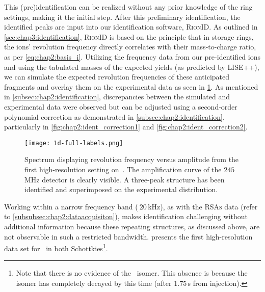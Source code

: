 \newpar
This (pre)identification can be realized without any prior knowledge of the ring settings, making it the initial step.
After this preliminary identification, the identified peaks are input into our identification software, \textsc{RionID}. As outlined in \cref{sec:chap3:identification}, \textsc{RionID} is based on the principle that in storage rings, the ions' revolution frequency directly correlates with their mass-to-charge ratio, as per \cref{eq:chap2:basis_i}.
Utilizing the frequency data from our pre-identified ions and using the tabulated masses \cite{AME-2020} of the expected yields (as predicted by \textsc{LISE++}), we can simulate the expected revolution frequencies of these anticipated fragments and overlay them on the experimental data as seen in \cref{fig:chap3:ident1D}.
As mentioned in \cref{subsec:chap2:identification}, discrepancies between the simulated and experimental data were observed but can be adjusted using a second-order polynomial correction as demonstrated in \cref{subsec:chap2:identification}, particularly in \cref{fig:chap2:ident_correction1} and \cref{fig:chap2:ident_correction2}.

\begin{figure}[hbt]
  \centering
  \texttt{[image: 1d-full-labels.png]}
  \caption{Spectrum displaying revolution frequency versus amplitude from the first high-resolution setting on \,. The amplification curve of the $245$\,MHz detector is clearly visible. A three-peak structure has been identified and superimposed on the experimental distribution.}
  \label{fig:chap3:ident1D}
\end{figure}

Working within a narrow frequency band ($~20$\,kHz), as with the \textsc{RSAs} data (refer to \cref{subsubsec:chap2:dataacquisiton}), makes identification challenging without additional information because these repeating structures, as discussed above, are not observable in such a restricted bandwidth.
 presents the first high-resolution data set for \, in both Schottkies\footnote{Note that there is no evidence of the \, isomer. This absence is because the isomer has completely decayed by this time (after $1.75$\,s from injection).}.

